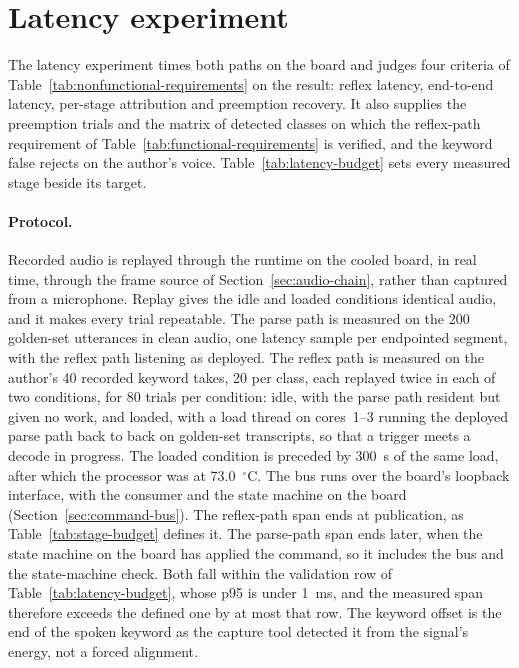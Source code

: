 \section{Latency experiment}
\label{sec:latency-experiment}
The latency experiment times both paths on the board and judges four criteria of
Table~\ref{tab:nonfunctional-requirements} on the result: reflex latency, end-to-end latency,
per-stage attribution and preemption recovery. It also supplies the preemption trials and the
matrix of detected classes on which the reflex-path requirement of
Table~\ref{tab:functional-requirements} is verified, and the keyword false rejects on the author's
voice. Table~\ref{tab:latency-budget} sets every measured stage beside its target.

\paragraph{Protocol.} Recorded audio is replayed through the runtime on the cooled board, in real
time, through the frame source of Section~\ref{sec:audio-chain}, rather than captured from a
microphone. Replay gives the idle and loaded conditions identical audio, and it makes every trial
repeatable. The parse path is measured on the 200 golden-set utterances in clean audio, one latency
sample per endpointed segment, with the reflex path listening as deployed. The reflex path is
measured on the author's 40 recorded keyword takes, 20 per class, each replayed twice in each of two
conditions, for 80 trials per condition: idle, with the parse path resident but given no work, and
loaded, with a load thread on cores~1--3 running the deployed parse path back to back on golden-set
transcripts, so that a trigger meets a decode in progress. The loaded condition is preceded by 300~s
of the same load, after which the processor was at 73.0~$^{\circ}$C. The bus runs over the board's
loopback interface, with the consumer and the state machine on the board
(Section~\ref{sec:command-bus}). The reflex-path span ends at publication, as
Table~\ref{tab:stage-budget} defines it. The parse-path span ends later, when the state machine on
the board has applied the command, so it includes the bus and the state-machine check. Both fall
within the validation row of Table~\ref{tab:latency-budget}, whose p95 is under 1~ms, and the
measured span therefore exceeds the defined one by at most that row. The keyword offset is the end
of the spoken keyword as the capture tool detected it from the signal's energy, not a forced
alignment.

